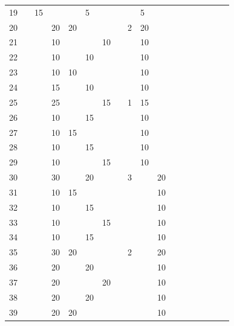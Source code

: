 \begin{table}[t]
\begin{center}
\begin{tabular}{r|g c g c g c g c g c g c g c g c g}
   19 &    & 15 &    &    &  5 &    &    &   &  5 &    &    &    &    &   &   &   & \\
   20 &    &    & 20 & 20 &    &    &    & 2 & 20 &    &    &    &    &   &   &   & \\
   21 &    &    & 10 &    &    & 10 &    &   & 10 &    &    &    &    &   &   &   & \\
   22 &    &    & 10 &    & 10 &    &    &   & 10 &    &    &    &    &   &   &   & \\
   23 &    &    & 10 & 10 &    &    &    &   & 10 &    &    &    &    &   &   &   & \\
   24 &    &    & 15 &    & 10 &    &    &   & 10 &    &    &    &    &   &   &   & \\
   25 &    &    & 25 &    &    & 15 &    & 1 & 15 &    &    &    &    &   &   &   & \\
   26 &    &    & 10 &    & 15 &    &    &   & 10 &    &    &    &    &   &   &   & \\
   27 &    &    & 10 & 15 &    &    &    &   & 10 &    &    &    &    &   &   &   & \\
   28 &    &    & 10 &    & 15 &    &    &   & 10 &    &    &    &    &   &   &   & \\
   29 &    &    & 10 &    &    & 15 &    &   & 10 &    &    &    &    &   &   &   & \\
   30 &    &    & 30 &    & 20 &    &    & 3 &    & 20 &    &    &    &   &   &   & \\
   31 &    &    & 10 & 15 &    &    &    &   &    & 10 &    &    &    &   &   &   & \\
   32 &    &    & 10 &    & 15 &    &    &   &    & 10 &    &    &    &   &   &   & \\
   33 &    &    & 10 &    &    & 15 &    &   &    & 10 &    &    &    &   &   &   & \\
   34 &    &    & 10 &    & 15 &    &    &   &    & 10 &    &    &    &   &   &   & \\
   35 &    &    & 30 & 20 &    &    &    & 2 &    & 20 &    &    &    &   &   &   & \\
   36 &    &    & 20 &    & 20 &    &    &   &    & 10 &    &    &    &   &   &   & \\
   37 &    &    & 20 &    &    & 20 &    &   &    & 10 &    &    &    &   &   &   & \\
   38 &    &    & 20 &    & 20 &    &    &   &    & 10 &    &    &    &   &   &   & \\
   39 &    &    & 20 & 20 &    &    &    &   &    & 10 &    &    &    &   &   &   & \\

\end{tabular}
\end{center}
\end{table}
